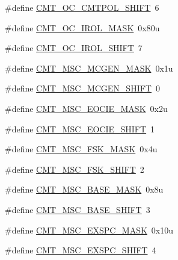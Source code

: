 \begin{DoxyCompactItemize}
\item 
\#define \hyperlink{group___c_m_t___register___masks_gaa20b0e3e0a6bc7db56b8c87f1fa24fb8}{C\+M\+T\+\_\+\+O\+C\+\_\+\+C\+M\+T\+P\+O\+L\+\_\+\+S\+H\+I\+FT}~6
\item 
\#define \hyperlink{group___c_m_t___register___masks_gadb4b1905fcea060fccf7c4486db6908f}{C\+M\+T\+\_\+\+O\+C\+\_\+\+I\+R\+O\+L\+\_\+\+M\+A\+SK}~0x80u
\item 
\#define \hyperlink{group___c_m_t___register___masks_gae67f5985213b34945cc357cfde809125}{C\+M\+T\+\_\+\+O\+C\+\_\+\+I\+R\+O\+L\+\_\+\+S\+H\+I\+FT}~7
\item 
\#define \hyperlink{group___c_m_t___register___masks_ga009968608dc16f63225cbfa192f0e159}{C\+M\+T\+\_\+\+M\+S\+C\+\_\+\+M\+C\+G\+E\+N\+\_\+\+M\+A\+SK}~0x1u
\item 
\#define \hyperlink{group___c_m_t___register___masks_ga1245001d81145a1cede60ee0d98b9522}{C\+M\+T\+\_\+\+M\+S\+C\+\_\+\+M\+C\+G\+E\+N\+\_\+\+S\+H\+I\+FT}~0
\item 
\#define \hyperlink{group___c_m_t___register___masks_gab7f246dc8aa0260f2696a23de0482cef}{C\+M\+T\+\_\+\+M\+S\+C\+\_\+\+E\+O\+C\+I\+E\+\_\+\+M\+A\+SK}~0x2u
\item 
\#define \hyperlink{group___c_m_t___register___masks_gaa7fa1a5e01690a63a09459cca5b763d0}{C\+M\+T\+\_\+\+M\+S\+C\+\_\+\+E\+O\+C\+I\+E\+\_\+\+S\+H\+I\+FT}~1
\item 
\#define \hyperlink{group___c_m_t___register___masks_gae434ad9168835c6d9e4d941a90a568cb}{C\+M\+T\+\_\+\+M\+S\+C\+\_\+\+F\+S\+K\+\_\+\+M\+A\+SK}~0x4u
\item 
\#define \hyperlink{group___c_m_t___register___masks_ga73422722bbae07a50d0b2b473f5f9417}{C\+M\+T\+\_\+\+M\+S\+C\+\_\+\+F\+S\+K\+\_\+\+S\+H\+I\+FT}~2
\item 
\#define \hyperlink{group___c_m_t___register___masks_gac099af54e9456cad9c3343184d3e041a}{C\+M\+T\+\_\+\+M\+S\+C\+\_\+\+B\+A\+S\+E\+\_\+\+M\+A\+SK}~0x8u
\item 
\#define \hyperlink{group___c_m_t___register___masks_ga3ddb10ae744a6e2149a0d0185a796571}{C\+M\+T\+\_\+\+M\+S\+C\+\_\+\+B\+A\+S\+E\+\_\+\+S\+H\+I\+FT}~3
\item 
\#define \hyperlink{group___c_m_t___register___masks_gafeb71169b6c47237583101487f6412e1}{C\+M\+T\+\_\+\+M\+S\+C\+\_\+\+E\+X\+S\+P\+C\+\_\+\+M\+A\+SK}~0x10u
\item 
\#define \hyperlink{group___c_m_t___register___masks_ga7a71704451408ca7e8c8802fa72d4e4d}{C\+M\+T\+\_\+\+M\+S\+C\+\_\+\+E\+X\+S\+P\+C\+\_\+\+S\+H\+I\+FT}~4
\item 

\end{DoxyCompactItemize}

